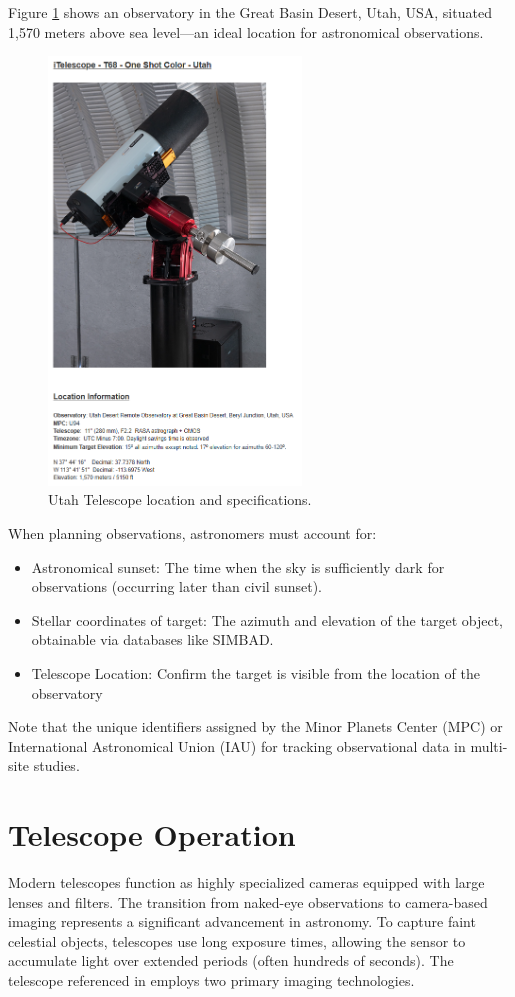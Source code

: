 \documentclass[12pt,oneside,a4paper,english]{article}
\begin{document}
Figure \ref{telescope2} shows an observatory in the Great Basin Desert, Utah, USA, situated 1,570 meters above sea level—an ideal location for astronomical observations.

\begin{figure}[H]
    \centering
    \includegraphics[width=0.6\textwidth]{Telescope1.png}
    \caption{Utah Telescope location and specifications.\cite{utahscope}}
    \label{telescope2}
\end{figure}
\newpage
When planning observations, astronomers must account for:
\begin{itemize}
    \item Astronomical sunset: The time when the sky is sufficiently dark for observations (occurring later than civil sunset).
    \item Stellar coordinates of target: The azimuth and elevation of the target object, obtainable via databases like SIMBAD.
    \item Telescope Location: Confirm the target is visible from the location of the observatory
\end{itemize}
Note that the unique identifiers assigned by the Minor Planets Center (MPC) or International Astronomical Union (IAU) for tracking observational data in multi-site studies.\cite{utahscope}
\section{Telescope Operation}
Modern telescopes function as highly specialized cameras equipped with large lenses and filters. The transition from naked-eye observations to camera-based imaging represents a significant advancement in astronomy. To capture faint celestial objects, telescopes use long exposure times, allowing the sensor to accumulate light over extended periods (often hundreds of seconds). The telescope referenced in \cite{utahscope} employs two primary imaging technologies.
\end{document}
